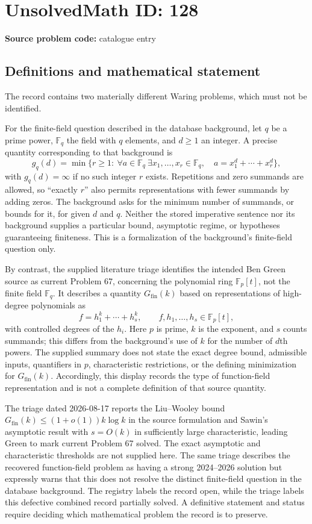 \documentclass[11pt]{article}
\newcommand{\F}{\mathbb{F}}
\begin{document}
\section*{UnsolvedMath ID: 128}
\textbf{Source problem code:} catalogue entry
\subsection{Definitions and mathematical statement}
The record contains two materially different Waring problems, which must not be identified.

For the finite-field question described in the database background, let $q$ be a prime power, $\F_q$ the field with $q$ elements, and $d\geq1$ an integer. A precise quantity corresponding to that background is
\[
g_q(d)=\min\{r\geq1:\ \forall a\in\F_q\ \exists x_1,\ldots,x_r\in\F_q,
\quad a=x_1^d+\cdots+x_r^d\},
\]
with $g_q(d)=\infty$ if no such integer $r$ exists. Repetitions and zero summands are allowed, so ``exactly $r$'' also permits representations with fewer summands by adding zeros. The background asks for the minimum number of summands, or bounds for it, for given $d$ and $q$. Neither the stored imperative sentence nor its background supplies a particular bound, asymptotic regime, or hypotheses guaranteeing finiteness. This is a formalization of the background's finite-field question only.

By contrast, the supplied literature triage identifies the intended Ben Green source as current Problem 67, concerning the polynomial ring $\F_p[t]$, not the finite field $\F_q$. It describes a quantity $G_{\mathrm{fin}}(k)$ based on representations of high-degree polynomials as
\[
f=h_1^k+\cdots+h_s^k,\qquad f,h_1,\ldots,h_s\in\F_p[t],
\]
with controlled degrees of the $h_i$. Here $p$ is prime, $k$ is the exponent, and $s$ counts summands; this differs from the background's use of $k$ for the number of $d$th powers. The supplied summary does not state the exact degree bound, admissible inputs, quantifiers in $p$, characteristic restrictions, or the defining minimization for $G_{\mathrm{fin}}(k)$. Accordingly, this display records the type of function-field representation and is not a complete definition of that source quantity.

The triage dated 2026-08-17 reports the Liu--Wooley bound $G_{\mathrm{fin}}(k)\leq(1+o(1))k\log k$ in the source formulation and Sawin's asymptotic result with $s=O(k)$ in sufficiently large characteristic, leading Green to mark current Problem 67 solved. The exact asymptotic and characteristic thresholds are not supplied here. The same triage describes the recovered function-field problem as having a strong 2024--2026 solution but expressly warns that this does not resolve the distinct finite-field question in the database background. The registry labels the record open, while the triage labels this defective combined record partially solved. A definitive statement and status require deciding which mathematical problem the record is to preserve.
\end{document}
